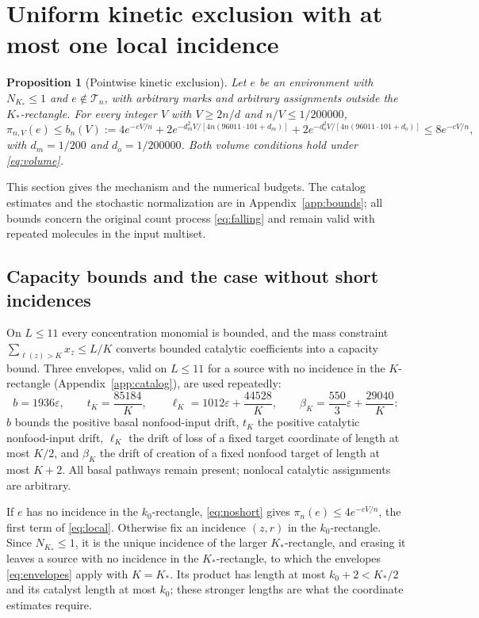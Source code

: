 \documentclass[11pt,letterpaper]{article}
\theoremstyle{plain}
\newtheorem{proposition}[theorem]{Proposition}
\theoremstyle{definition}
\theoremstyle{remark}
\numberwithin{equation}{section}
\newcommand{\cT}{\mathcal T}
\newcommand{\eps}{\varepsilon}
\begin{document}
\section{Uniform kinetic exclusion with at most one local incidence}\label{sec:local}

\begin{proposition}[Pointwise kinetic exclusion]\label{prop:local}
Let $e$ be an environment with $N_{K_*}\le1$ and $e\notin\cT_n$, with arbitrary marks and arbitrary assignments outside the $K_*$-rectangle. For every integer $V$ with $V\ge2n/d$ and $n/V\le1/200000$,
\begin{equation}\label{eq:local}
 \pi_{n,V}(e)\le b_n(V):=4e^{-cV/n}+2e^{-d_m^2V/[4n(96011\cdot101+d_m)]}+2e^{-d_o^2V/[4n(96011\cdot101+d_o)]}\le8e^{-cV/n},
\end{equation}
with $d_m=1/200$ and $d_o=1/200000$. Both volume conditions hold under \eqref{eq:volume}.
\end{proposition}
This section gives the mechanism and the numerical budgets. The catalog estimates and the stochastic normalization are in Appendix~\ref{app:bounds}; all bounds concern the original count process \eqref{eq:falling} and remain valid with repeated molecules in the input multiset.

\subsection{Capacity bounds and the case without short incidences}
On $L\le11$ every concentration monomial is bounded, and the mass constraint $\sum_{\ell(z)>K}x_z\le L/K$ converts bounded catalytic coefficients into a capacity bound. Three envelopes, valid on $L\le11$ for a source with no incidence in the $K$-rectangle (Appendix~\ref{app:catalog}), are used repeatedly:
\begin{equation}\label{eq:envelopes}
 b=1936\eps,\qquad t_K=\frac{85184}{K},\qquad \ell_K=1012\eps+\frac{44528}{K},\qquad \beta_K=\frac{550}3\eps+\frac{29040}{K}:
\end{equation}
$b$ bounds the positive basal nonfood-input drift, $t_K$ the positive catalytic nonfood-input drift, $\ell_K$ the drift of loss of a fixed target coordinate of length at most $K/2$, and $\beta_K$ the drift of creation of a fixed nonfood target of length at most $K+2$. All basal pathways remain present; nonlocal catalytic assignments are arbitrary.

If $e$ has no incidence in the $k_0$-rectangle, \eqref{eq:noshort} gives $\pi_n(e)\le4e^{-cV/n}$, the first term of \eqref{eq:local}. Otherwise fix an incidence $(z,r)$ in the $k_0$-rectangle. Since $N_{K_*}\le1$, it is the unique incidence of the larger $K_*$-rectangle, and erasing it leaves a source with no incidence in the $K_*$-rectangle, to which the envelopes \eqref{eq:envelopes} apply with $K=K_*$. Its product has length at most $k_0+2<K_*/2$ and its catalyst length at most $k_0$; these stronger lengths are what the coordinate estimates require.
\end{document}
